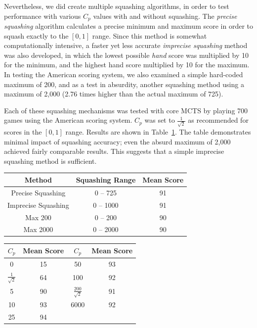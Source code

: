 \documentclass[letterpaper]{article}
\begin{document}
Nevertheless, we did create multiple squashing algorithms, in order to test performance with various $C_p$ values with and without squashing. The {\it precise squashing} algorithm calculates a precise minimum and maximum score in order to squash exactly to the $[0,1]$ range. Since this method is somewhat computationally intensive, a faster yet less accurate {\it imprecise squashing} method was also developed, in which the lowest possible {\it hand} score was multiplied by 10 for the minimum, and the highest hand score multiplied by 10 for the maximum. In testing the American scoring system, we also examined a simple hard-coded maximum of 200, and as a test in absurdity, another squashing method using a maximum of 2,000 (2.76 times higher than the actual maximum of 725).

Each of these squashing mechanisms was tested with core MCTS by playing 700 games using the American scoring system. $C_p$ was set to $\frac{1}{\sqrt{2}}$ as recommended for scores in the $[0,1]$ range. Results are shown in Table~\ref{tbl:Squashing}. The table demonstrates minimal impact of squashing accuracy; even the absurd maximum of 2,000 achieved fairly comparable results. This suggests that a simple imprecise squashing method is sufficient.

\begin{table}
\label{tbl:Squashing}
\centering
\begin{tabular}{c c c}
\hline
Method & Squashing Range & Mean Score \\
\hline
Precise Squashing & 0 -- 725 & 91 \\
Imprecise Squashing & 0 -- 1000 & 91 \\
Max 200 & 0 -- 200 & 90 \\
Max 2000 & 0 -- 2000 & 90 \\
\hline
\end{tabular}
\end{table}

\begin{table}[b]
\label{tbl:noSquashing}
\centering
\begin{tabular}{c c || c c}
\hline
{\bf $C_p$} & {\bf Mean Score} & {\bf $C_p$} & {\bf Mean Score} \\
\hline
0 & 15 &                                        50 & 93        \\
$\frac{1}{\sqrt{2}}$ & 64 &                      100 & 92                       \\
5 & 90 &                                        $\frac{200}{\sqrt{2}}$ & 91       \\
10 & 93 &                                      6000 & 92        \\
25 & 94 \\
\hline
\end{tabular}
\end{table}
\end{document}
